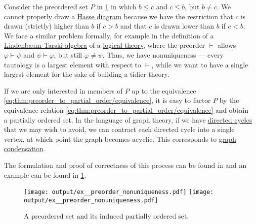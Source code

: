 \begin{example}\label{ex:preorder_nonuniqueness}
  Consider the preordered set \( P \) in \cref{fig:ex:preorder_nonuniqueness} in which \( b \leq c \) and \( c \leq b \), but \( b \neq c \). We cannot properly draw a \hyperref[def:hasse_diagram]{Hasse diagram} because we have the restriction that \( c \) is drawn (strictly) higher than \( b \) if \( c > b \) and that \( c \) is drawn lower than \( b \) if \( c < b \). We face a similar problem formally, for example in the definition of a \hyperref[def:lindenbaum_tarski_algebra]{Lindenbaum-Tarski algebra} of a \hyperref[def:first_order_theory]{logical theory}, where the preorder \( \vdash \) allows \( \varphi \vdash \psi \) and \( \psi \vdash \varphi \), but still \( \varphi \neq \psi \). Thus, we have nonuniqueness --- every tautology is a largest element with respect to \( \vdash \), while we want to have a single largest element for the sake of building a tidier theory.

  If we are only interested in members of \( P \) up to the equivalence \eqref{eq:thm:preorder_to_partial_order/equivalence}, it is easy to factor \( P \) by the equivalence relation \eqref{eq:thm:preorder_to_partial_order/equivalence} and obtain a partially ordered set. In the language of graph theory, if we have \hyperref[def:quiver_path/cycle]{directed cycles} that we may wish to avoid, we can contract each directed cycle into a single vertex, at which point the graph becomes acyclic. This corresponds to \hyperref[def:quiver_condensation]{graph condensation}.

  The formulation and proof of correctness of this process can be found in  and an example can be found in \cref{fig:ex:preorder_nonuniqueness}.

  \begin{figure}[!ht]
    \hfill
    \texttt{[image: output/ex\_\_preorder\_nonuniqueness.pdf]}
    \hfill
    \texttt{[image: output/ex\_\_preorder\_nonuniqueness.pdf]}
    \hfill\hfill
    \caption{A preordered set and its induced partially ordered set.}
    \label{fig:ex:preorder_nonuniqueness}
  \end{figure}
\end{example}

